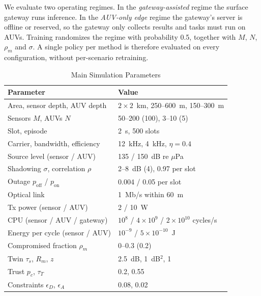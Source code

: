 \documentclass[lettersize,journal]{IEEEtran}
\begin{document}
We evaluate two operating regimes. In the \emph{gateway-assisted} regime the surface gateway runs inference. In the \emph{AUV-only edge} regime the gateway's server is offline or reserved, so the gateway only collects results and tasks must run on AUVs. Training randomizes the regime with probability 0.5, together with $M$, $N$, $\rho_m$ and $\sigma$. A single policy per method is therefore evaluated on every configuration, without per-scenario retraining.

\begin{table}[!t]
\centering
\caption{Main Simulation Parameters}
\label{tab:params}
\setlength{\tabcolsep}{4pt}
\begin{tabular}{@{}ll@{}}
\toprule
Parameter & Value\\
\midrule
Area, sensor depth, AUV depth & $2\times2$~km, 250--600~m, 150--300~m\\
Sensors $M$, AUVs $N$ & 50--200 (100), 3--10 (5)\\
Slot, episode & 2~s, 500 slots\\
Carrier, bandwidth, efficiency & 12~kHz, 4~kHz, $\eta=0.4$\\
Source level (sensor / AUV) & 135 / 150~dB re $\mu$Pa\\
Shadowing $\sigma$, correlation $\rho$ & 2--8~dB (4), 0.97 per slot\\
Outage $p_{\mathrm{off}}$ / $p_{\mathrm{on}}$ & 0.004 / 0.05 per slot\\
Optical link & 1~Mb/s within 60~m\\
Tx power (sensor / AUV) & 2 / 10~W\\
CPU (sensor / AUV / gateway) & $10^8$ / $4\times10^9$ / $2\times10^{10}$ cycles/s\\
Energy per cycle (sensor / AUV) & $10^{-9}$ / $5\times10^{-10}$~J\\
Compromised fraction $\rho_m$ & 0--0.3 (0.2)\\
Twin $\tau_s$, $R_m$, $z$ & 2.5~dB, 1~dB$^2$, 1\\
Trust $p_c$, $\tau_T$ & 0.2, 0.55\\
Constraints $\epsilon_D$, $\epsilon_A$ & 0.08, 0.02\\
\bottomrule
\end{tabular}
\end{table}
\end{document}

